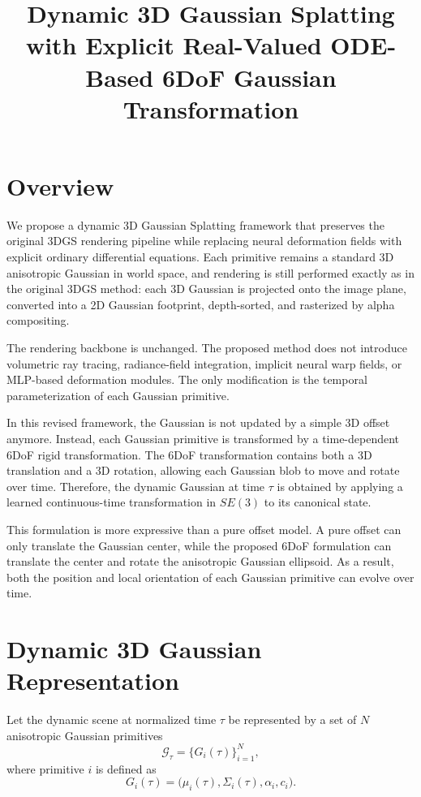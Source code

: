 \documentclass[11pt]{article}
\title{Dynamic 3D Gaussian Splatting with Explicit Real-Valued ODE-Based 6DoF Gaussian Transformation}
\date{}
\begin{document}
\maketitle

\section{Overview}

We propose a dynamic 3D Gaussian Splatting framework that preserves the original 3DGS rendering pipeline while replacing neural deformation fields with explicit ordinary differential equations. Each primitive remains a standard 3D anisotropic Gaussian in world space, and rendering is still performed exactly as in the original 3DGS method: each 3D Gaussian is projected onto the image plane, converted into a 2D Gaussian footprint, depth-sorted, and rasterized by alpha compositing.

The rendering backbone is unchanged. The proposed method does not introduce volumetric ray tracing, radiance-field integration, implicit neural warp fields, or MLP-based deformation modules. The only modification is the temporal parameterization of each Gaussian primitive.

In this revised framework, the Gaussian is not updated by a simple 3D offset anymore. Instead, each Gaussian primitive is transformed by a time-dependent 6DoF rigid transformation. The 6DoF transformation contains both a 3D translation and a 3D rotation, allowing each Gaussian blob to move and rotate over time. Therefore, the dynamic Gaussian at time $\tau$ is obtained by applying a learned continuous-time transformation in $SE(3)$ to its canonical state.

This formulation is more expressive than a pure offset model. A pure offset can only translate the Gaussian center, while the proposed 6DoF formulation can translate the center and rotate the anisotropic Gaussian ellipsoid. As a result, both the position and local orientation of each Gaussian primitive can evolve over time.

\section{Dynamic 3D Gaussian Representation}

Let the dynamic scene at normalized time $\tau$ be represented by a set of $N$ anisotropic Gaussian primitives
\begin{equation}
\mathcal{G}_{\tau}=\{G_i(\tau)\}_{i=1}^N,
\end{equation}
where primitive $i$ is defined as
\begin{equation}
G_i(\tau)=\bigl(\mu_i(\tau),\Sigma_i(\tau),\alpha_i,c_i\bigr).
\end{equation}
\end{document}
